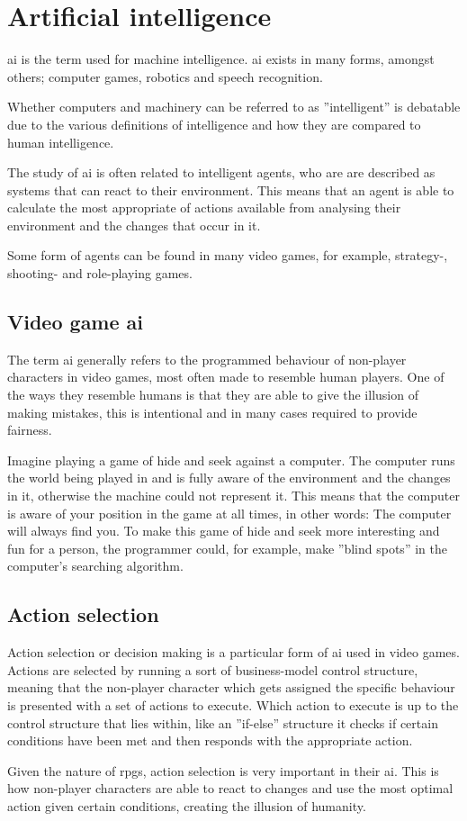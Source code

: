 \section{Artificial intelligence}
\ac{ai} is the term used for machine intelligence. \ac{ai} exists in many forms, amongst others; computer games, robotics and speech recognition.

Whether computers and machinery can be referred to as ''intelligent'' is debatable due to the various definitions of intelligence and how they are compared to human intelligence.

The study of \ac{ai} is often related to intelligent agents, who are are described as systems that can react to their environment. This means that an agent is able to calculate the most appropriate of actions available from analysing their environment and the changes that occur in it.

Some form of agents can be found in many video games, for example, strategy-, shooting- and role-playing games.\cite{artint}

\subsection{Video game \ac{ai}}
The term \ac{ai} generally refers to the programmed behaviour of non-player characters in video games, most often made to resemble human players. One of the ways they resemble humans is that they are able to give the illusion of making mistakes, this is intentional and in many cases required to provide fairness.

Imagine playing a game of hide and seek against a computer. The computer runs the world being played in and is fully aware of the environment and the changes in it, otherwise the machine could not represent it. This means that the computer is aware of your position in the game at all times, in other words: The computer will always find you. To make this game of hide and seek more interesting and fun for a person, the programmer could, for example, make ''blind spots'' in the computer's searching algorithm.\cite{videoint}

\subsection{Action selection}
\label{analysis:action}
Action selection or decision making is a particular form of \ac{ai} used in video games. Actions are selected by running a sort of business-model control structure, meaning that the non-player character which gets assigned the specific behaviour is presented with a set of actions to execute. Which action to execute is up to the control structure that lies within, like an ''if-else'' structure it checks if certain conditions have been met and then responds with the appropriate action.\cite{actionselect}

Given the nature of \ac{rpgs}, action selection is very important in their \ac{ai}. This is how non-player characters are able to react to changes and use the most optimal action given certain conditions, creating the illusion of humanity.